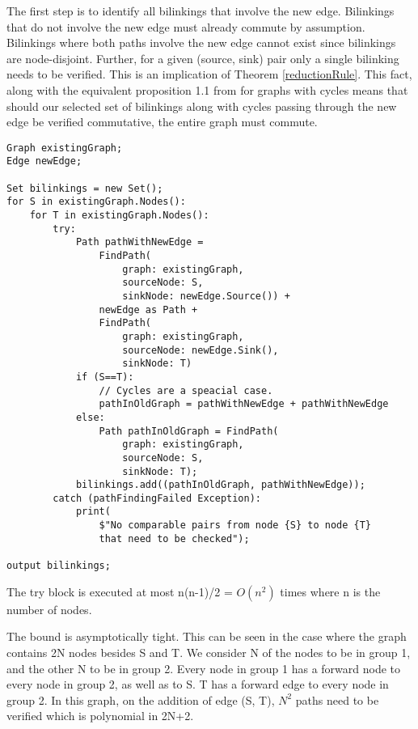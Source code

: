 \documentclass{article}
\newtheorem{theorem}{Theorem}
\begin{document}
The first step is to identify all bilinkings that involve the new edge.
Bilinkings that do not involve the new edge must already commute by assumption.
Bilinkings where both paths involve the new edge cannot exist since bilinkings are node-disjoint.
Further, for a given (source, sink) pair only a single bilinking needs to be verified. This is an implication of Theorem \ref{reductionRule}.
This fact, along with the equivalent proposition 1.1 from \cite{commutative} for graphs with cycles means that should our selected set of bilinkings along with cycles passing through the new edge be verified commutative, the entire graph must commute. %


\begin{verbatim}
Graph existingGraph;
Edge newEdge;

Set bilinkings = new Set();
for S in existingGraph.Nodes():
    for T in existingGraph.Nodes():
        try:
            Path pathWithNewEdge = 
                FindPath(
                    graph: existingGraph, 
                    sourceNode: S,
                    sinkNode: newEdge.Source()) +
                newEdge as Path +
                FindPath(
                    graph: existingGraph, 
                    sourceNode: newEdge.Sink(), 
                    sinkNode: T)
            if (S==T):
                // Cycles are a speacial case.
                pathInOldGraph = pathWithNewEdge + pathWithNewEdge
            else:
                Path pathInOldGraph = FindPath(
                    graph: existingGraph, 
                    sourceNode: S, 
                    sinkNode: T);
            bilinkings.add((pathInOldGraph, pathWithNewEdge));
        catch (pathFindingFailed Exception):
            print(
                $"No comparable pairs from node {S} to node {T} 
                that need to be checked");

output bilinkings;
\end{verbatim}

The try block is executed at most n(n-1)/2 = $O(n^2)$ times where n is the number of nodes.

The bound is asymptotically tight.
This can be seen in the case where the graph contains 2N nodes besides S and T. We consider N of the nodes to be in group 1, and the other N to be in group 2. Every node in group 1 has a forward node to every node in group 2, as well as to S. T has a forward edge to every node in group 2. In this graph, on the addition of edge (S, T), $N^2$ paths need to be verified which is polynomial in 2N+2.
\end{document}
